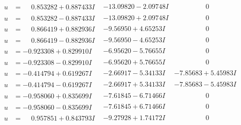 \documentclass[1p]{elsarticle_modified}
\theoremstyle{definition}
\begin{document}
$$\begin{array}{c|c|c}
\begin{aligned}
u &= \phantom{-}0.853282 + 0.887433 I\end{aligned}
 & -13.09820 - 2.09748 I & \phantom{-0.000000 } 0 \\ \hline\begin{aligned}
u &= \phantom{-}0.853282 - 0.887433 I\end{aligned}
 & -13.09820 + 2.09748 I & \phantom{-0.000000 } 0 \\ \hline\begin{aligned}
u &= \phantom{-}0.866419 + 0.882936 I\end{aligned}
 & -9.56950 + 4.65253 I & \phantom{-0.000000 } 0 \\ \hline\begin{aligned}
u &= \phantom{-}0.866419 - 0.882936 I\end{aligned}
 & -9.56950 - 4.65253 I & \phantom{-0.000000 } 0 \\ \hline\begin{aligned}
u &= -0.923308 + 0.829910 I\end{aligned}
 & -6.95620 - 5.76655 I & \phantom{-0.000000 } 0 \\ \hline\begin{aligned}
u &= -0.923308 - 0.829910 I\end{aligned}
 & -6.95620 + 5.76655 I & \phantom{-0.000000 } 0 \\ \hline\begin{aligned}
u &= -0.414794 + 0.619267 I\end{aligned}
 & -2.66917 - 5.34133 I & -7.85683 + 5.45983 I \\ \hline\begin{aligned}
u &= -0.414794 - 0.619267 I\end{aligned}
 & -2.66917 + 5.34133 I & -7.85683 - 5.45983 I \\ \hline\begin{aligned}
u &= -0.958060 + 0.835699 I\end{aligned}
 & -7.61845 - 6.71466 I & \phantom{-0.000000 } 0 \\ \hline\begin{aligned}
u &= -0.958060 - 0.835699 I\end{aligned}
 & -7.61845 + 6.71466 I & \phantom{-0.000000 } 0 \\ \hline\begin{aligned}
u &= \phantom{-}0.957851 + 0.843793 I\end{aligned}
 & -9.27928 + 1.74172 I & \phantom{-0.000000 } 0 \\ \hline\begin{aligned}

\end{aligned}
\end{array}$$
\end{document}
